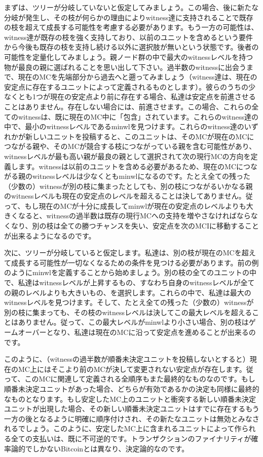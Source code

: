 \documentclass[a4paper, dvipdfmx]{jsarticle}
\begin{document}
まずは、ツリーが分岐していないと仮定してみましょう。この場合、後に新たな分岐が発生し、その枝が何らかの理由によりwitness達に支持されることで既存の枝を超えて成長する可能性を考慮する必要があります。もう一方の可能性は、witness達が既存の枝を強く支持しており、以前のユニットを含めるという要件から今後も既存の枝を支持し続ける以外に選択肢が無いという状態です。後者の可能性を定量化してみましょう。親ノード群の中で最大のwitnessレベルを持つ物が最良の親に選ばれることを思い出して下さい。過半数のwitnessに出会うまで、現在のMCを先端部分から過去へと遡ってみましょう（witness達は、現在の安定点に存在するユニットによって定義されるものとします）。彼らのうちの少なくとも1つが現在の安定点より前に存在する場合、私達は安定点を前進させることはありません。存在しない場合には、前進させます。この場合、これらの全てのwitnessは、既に現在のMC中に「包含」されています。これらのwitness達の中で、最小のwitnessレベルであるmin\textunderscore wlを見つけます。これらのwitness達のいずれかが新しいユニットを投稿すると、このユニットは、そのMCが現在のMCにつながる親や、そのMCが競合する枝につながっている親を含む可能性があり、witnessレベルが最も高い親が最良の親として選択されて次の現行MCの方向を定義します。witnessは以前のユニットを含める必要があるため、現在のMCにつながる親のwitnessレベルは少なくともmin\textunderscore wlになるのです。たとえ全ての残った（少数の）witnessが別の枝に集まったとしても、別の枝につながるいかなる親のwitnessレベルも現在の安定点のレベルを超えることは決してありません。従って、もし現在のMCが十分に成長してmin\textunderscore wlが現在の安定点のレベルよりも大きくなると、witnessの過半数は既存の現行MCへの支持を増やさなければならなくなり、別の枝は全ての勝つチャンスを失い、安定点を次のMCIに移動することが出来るようになるのです。

次に、ツリーが分岐していると仮定します。私達は、別の枝が現在のMCを超えて成長する可能性が一切なくなるための条件を見つける必要があります。前の例のようにmin\textunderscore wlを定義することから始めましょう。別の枝の全てのユニットの中で、私達はwitnessレベルが上昇するもの、すなわち自身のwitnessレベルが全ての親のレベルよりも大きいもの、を選択します。これらの中で、私達は最大のwitnessレベルを見つけます。そして、たとえ全ての残った（少数の）witnessが別の枝に集まっても、その枝のwitnessレベルは決してこの最大レベルを超えることはありません。従って、この最大レベルがmin\textunderscore wlより小さい場合、別の枝はゲームオーバーとなり、私達は現在のMCに沿って安定点を進めることが出来るのです。

このように、（witnessの過半数が順番未決定ユニットを投稿しないとすると）現在のMC上にはそこより前のMCが決して変更されない安定点が存在します。従って、このMCに関連して定義される全順序もまた最終的なものなのです。もし順番未決定ユニットがあった場合、どちらが有効であるかの決定も同様に最終的なものとなります。もし安定したMC上のユニットと衝突する新しい順番未決定ユニットが出現した場合、その新しい順番未決定ユニットはすでに存在するもう一方の後となるように明確に順序付けされ、その新たなユニットは無効とみなされるでしょう。このように、安定したMC上に含まれるユニットによって作られる全ての支払いは、既に不可逆的です。トランザクションのファイナリティが確率論的でしかないBitcoinとは異なり、決定論的なのです。
\end{document}
